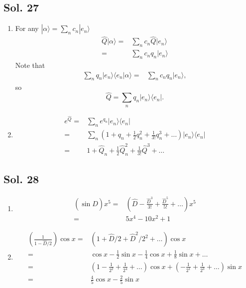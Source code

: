 \subsection*{Sol. 27}
\begin{enumerate}
    \item For any $|\alpha\rangle = \sum_nc_n|e_n\rangle$ 
    \begin{align*}
        \hat{Q}|\alpha\rangle =& 
        \sum_nc_n\hat{Q}|e_n\rangle\\
        =& \sum_nc_nq_n|e_n\rangle
    \end{align*}
    Note that 
    \begin{align*}
        \sum_nq_n|e_n\rangle\langle e_n|\alpha\rangle 
        =& \sum_nc_nq_n|e_n\rangle,
    \end{align*}
    so 
    $$
    \hat{Q}=\sum_nq_n|e_n\rangle\langle e_n|.
    $$
    \item 
    \begin{align*}
        e^{\hat{Q}}
        =& 
        \sum_ne^{q_n}
        |e_n\rangle\langle e_n|\\
        =&
        \sum_n
        (1+q_n+\frac{1}{2}q_n^2 + \frac{1}{3!}q_n^3+\dots)
        |e_n\rangle\langle e_n|\\
        =&1+\hat{Q}_n+\frac{1}{2}\hat{Q}_n^2+\frac{1}{3!}\hat{Q}^3+\dots
    \end{align*}
\end{enumerate}

\subsection*{Sol. 28}
\begin{enumerate}
    \item 
    \begin{align*}
        (\sin\hat{D})x^5 = & 
        \left(\hat{D} - \frac{\hat{D}^3}{3!}+\frac{\hat{D}^5}{5!}+\dots
        \right)x^5\\
        =& 
        5x^4 - 10x^2 + 1
    \end{align*}
    \item 
    \begin{align*}
        \left(
        \frac{1}{1-\hat{D}/2}
        \right)\cos x
        =&(1+\hat{D}/2 + \hat{D}^2/2^2 + \dots)\cos x\\
        =&\cos x - \frac{1}{2}\sin x - \frac{1}{4}\cos x + \frac{1}{8}\sin x + \dots\\
        =& (1-\frac{1}{2^2}+\frac{1}{2^4}+\dots)\cos x
        +(-\frac{1}{2^1}+\frac{1}{2^3}+\dots)\sin x\\
        =& \frac{4}{5}\cos x - \frac{2}{5}\sin x
    \end{align*}
\end{enumerate}

